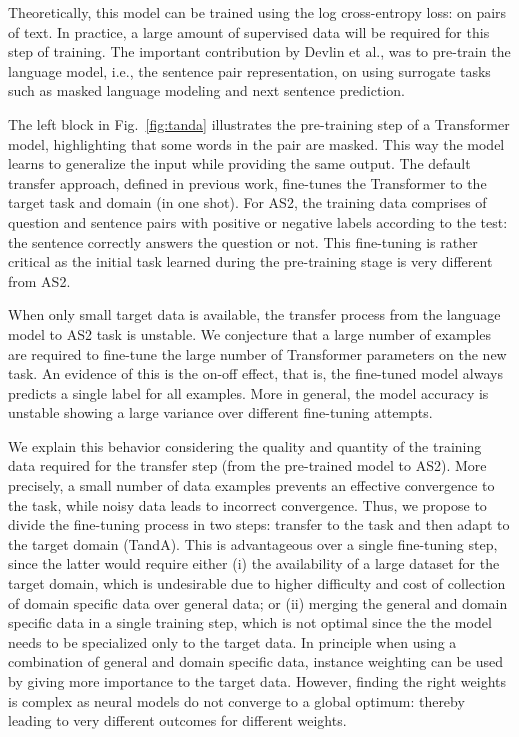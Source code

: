 \documentclass[letterpaper]{article} \usepackage{aaai20}  \usepackage{times}  \usepackage{helvet} \usepackage{courier}  \usepackage[hyphens]{url}  \usepackage{graphicx} \urlstyle{rm} \def\UrlFont{\rm}  \usepackage{graphicx}  \usepackage{todonotes}
\newcommand{\TANDA}{T{\sc and}A}
\begin{document}
Theoretically, this model can be trained using the log cross-entropy loss:  on pairs of text. In practice, a large amount of supervised data will be required for this step of training. The important contribution by Devlin et al.,  was to pre-train the language model, i.e., the sentence pair representation, on using surrogate tasks such as masked language modeling and next sentence prediction.

The left block in Fig.~\ref{fig:tanda} illustrates the pre-training step of a Transformer model, highlighting that some words in the pair are masked. This way the model learns to generalize the input while providing the same output. 
The default transfer approach, defined in previous work, fine-tunes the Transformer to the target task and domain (in one shot). For AS2, the training data comprises of question and sentence pairs with positive or negative labels according to the test: the sentence correctly answers the question or not.  This fine-tuning is rather critical as the initial task learned during the pre-training stage is very different from AS2. 

When only small target data is available, the transfer process from the language model to AS2 task is unstable. We conjecture that a large number of examples are required to fine-tune the large number of Transformer parameters on the new task. An evidence of this is the on-off effect, that is, the fine-tuned model always predicts a single label for all examples. More in general, the model accuracy is unstable showing a large variance over different fine-tuning attempts. 

We explain this behavior considering the quality and quantity of the training data required for the transfer step (from the pre-trained model to AS2). More precisely, a small number of data examples prevents an effective convergence to the task, while noisy data leads to incorrect convergence. Thus, we propose to divide the fine-tuning process in two steps: transfer to the task and then adapt to the target domain ({\TANDA}). 
This is advantageous over a single fine-tuning step, since the latter would require either (i) the availability of a large dataset for the target domain, which is undesirable due to higher difficulty and cost of collection of domain specific data over general data; or (ii) merging the general and domain specific data in a single training step, which is not optimal since the the model needs to be specialized only to the target data. 
In principle when using a combination of general and domain specific data, instance weighting can be used by giving more importance to the target data. However, finding the right weights is complex as neural models do not converge to a global optimum: thereby leading to very different outcomes for different weights.
 
\end{document}

